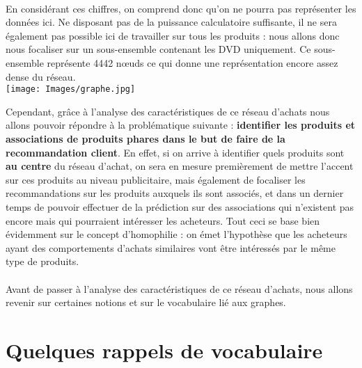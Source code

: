 \documentclass[14pt, openany]{article}
\begin{document}
\paragraph{}
En considérant ces chiffres, on comprend donc qu'on ne pourra pas représenter les données ici. Ne disposant pas de la puissance calculatoire suffisante, il ne sera également pas possible ici de travailler sur tous les produits : nous allons donc nous focaliser sur un sous-ensemble contenant les DVD uniquement. Ce sous-ensemble représente 4442 nœuds ce qui donne une représentation encore assez dense du réseau.\\
\texttt{[image: Images/graphe.jpg]}
\begin{center}
\label{fig1}
\end{center}
Cependant, grâce à l'analyse des caractéristiques de ce réseau d'achats nous allons pouvoir répondre à la problématique suivante : \textbf{identifier les produits et associations de produits phares dans le but de faire de la recommandation client}. En effet, si on arrive à identifier quels produits sont \textbf{au centre} du réseau d'achat, on sera en mesure premièrement de mettre l'accent sur ces produits au niveau publicitaire, mais également de focaliser les recommandations sur les produits auxquels ils sont associés, et dans un dernier temps de pouvoir effectuer de la prédiction sur des associations qui n'existent pas encore mais qui pourraient intéresser les acheteurs. Tout ceci se base bien évidemment sur le concept d'homophilie : on émet l'hypothèse que les acheteurs ayant des comportements d'achats similaires vont être intéressés par le même type de produits.
\paragraph{}
Avant de passer à l'analyse des caractéristiques de ce réseau d'achats, nous allons revenir sur certaines notions et sur le vocabulaire lié aux graphes.

\section{Quelques rappels de vocabulaire}
\end{document}
